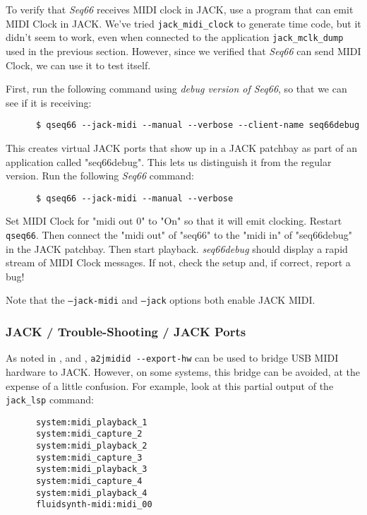    To verify that \textsl{Seq66} receives MIDI clock in JACK, use a program
   that can emit MIDI Clock in JACK.
   We've tried \texttt{jack\_midi\_clock} to generate time code, but
   it didn't seem to work, even when connected to the
   application \texttt{jack\_mclk\_dump} used in the previous section.
   However, since we verified that \textsl{Seq66} can send MIDI Clock, we can
   use it to test itself.

   First, run the following command using \textsl{debug version of Seq66}, so
   that we can see if it is receiving:

   \begin{verbatim}
      $ qseq66 --jack-midi --manual --verbose --client-name seq66debug
   \end{verbatim}

   This creates virtual JACK ports that show up in a JACK patchbay as part of
   an application called "seq66debug".  This lets us distinguish it from
   the regular version.  Run the following \textsl{Seq66} command:

   \begin{verbatim}
      $ qseq66 --jack-midi --manual --verbose
   \end{verbatim}

   Set MIDI Clock for "midi out 0" to "On" so that it will emit clocking.
   Restart \texttt{qseq66}.
   Then connect the "midi out" of "seq66" to the "midi in" of "seq66debug"
   in the JACK patchbay.
   Then start playback.
   \textsl{seq66debug} should display a rapid stream of MIDI Clock messages.
   If not, check the setup and, if correct, report a bug!

   Note that the \texttt{--jack-midi} and \texttt{--jack} options both
   enable JACK MIDI.

\subsubsection{JACK / Trouble-Shooting / JACK Ports}
\label{subsubsec:jack_trouble_shooting_jack_ports}

   As noted in
   , and
   ,
   \texttt{a2jmidid -{}-export-hw} can be used to bridge USB MIDI
   hardware to JACK.  However, on some systems, this bridge can be
   avoided, at the expense of a little confusion.
   For example, look at this partial output of the \texttt{jack\_lsp}
   command:

   \begin{verbatim}
      system:midi_playback_1
      system:midi_capture_2
      system:midi_playback_2
      system:midi_capture_3
      system:midi_playback_3
      system:midi_capture_4
      system:midi_playback_4
      fluidsynth-midi:midi_00
   \end{verbatim}

